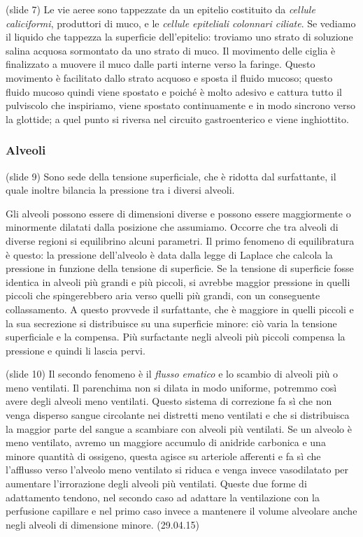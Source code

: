 \documentclass[a4paper,12pt]{article}
\begin{document}
(slide 7) Le vie aeree sono tappezzate da un epitelio costituito da \emph{cellule caliciformi}, produttori di muco, e le \emph{cellule epiteliali colonnari ciliate}. Se vediamo il liquido che tappezza la superficie dell'epitelio: troviamo uno strato di soluzione salina acquosa sormontato da uno strato di muco. Il movimento delle ciglia è finalizzato a muovere il muco dalle parti interne verso la faringe. Questo movimento è facilitato dallo strato acquoso e sposta il fluido mucoso; questo fluido mucoso quindi viene spostato e poiché è molto adesivo e cattura tutto il pulviscolo che inspiriamo, viene spostato continuamente e in modo sincrono verso la glottide; a quel punto si riversa nel circuito gastroenterico e viene inghiottito.

\subsubsection{Alveoli}
(slide 9) Sono sede della tensione superficiale, che è ridotta dal surfattante, il quale inoltre bilancia la pressione tra i diversi alveoli.

Gli alveoli possono essere di dimensioni diverse e possono essere maggiormente o minormente dilatati dalla posizione che assumiamo. Occorre che tra alveoli di diverse regioni si equilibrino alcuni parametri. Il primo fenomeno di equilibratura è questo: la pressione dell'alveolo è data dalla legge di Laplace che calcola la pressione in funzione della tensione di superficie. Se la tensione di superficie fosse identica in alveoli più grandi e più piccoli, si avrebbe maggior pressione in quelli piccoli che spingerebbero aria verso quelli più grandi, con un conseguente collassamento. A questo provvede il surfattante, che è maggiore in quelli piccoli e la sua secrezione si distribuisce su una superficie minore: ciò varia la tensione superficiale e la compensa. Più surfactante negli alveoli più piccoli compensa la pressione e quindi li lascia pervi.
 
(slide 10) Il secondo fenomeno è il \emph{flusso ematico} e lo scambio di alveoli più o meno ventilati. Il parenchima non si dilata in modo uniforme, potremmo così avere degli alveoli meno ventilati. Questo sistema di correzione fa sì che non venga disperso sangue circolante nei distretti meno ventilati e che si distribuisca la maggior parte del sangue a scambiare con alveoli più ventilati. Se un alveolo è meno ventilato, avremo un maggiore accumulo di anidride carbonica e una minore quantità di ossigeno, questa agisce su arteriole afferenti e fa sì che l'afflusso verso l'alveolo meno ventilato si riduca e venga invece vasodilatato per aumentare l'irrorazione degli alveoli più ventilati. Queste due forme di adattamento tendono, nel secondo caso ad adattare la ventilazione con la perfusione capillare e nel primo caso invece a mantenere il volume alveolare anche negli alveoli di dimensione minore. 
 (29.04.15)
 
\end{document}
